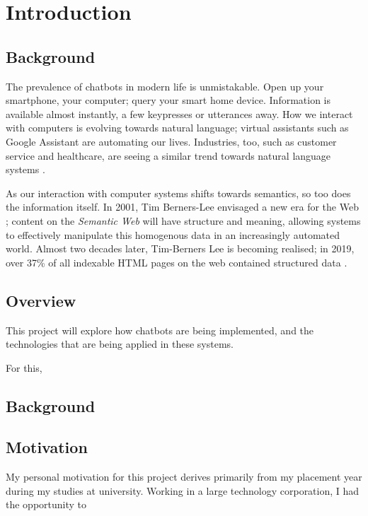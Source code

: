 \chapter{Introduction}
\label{ch:intro}
\section{Background}
The prevalence of chatbots in modern life is unmistakable. Open up your smartphone, your computer; query your smart home device. Information is available almost instantly, a few keypresses or utterances away. How we interact with computers is evolving towards natural language; virtual assistants such as Google Assistant are automating our lives. Industries, too, such as customer service and healthcare, are seeing a similar trend towards natural language systems \cite{gvr2017}.

As our interaction with computer systems shifts towards semantics, so too does the information itself. In 2001, Tim Berners-Lee envisaged a new era for the Web \cite{berners2001semantic}; content on the {\it Semantic Web} will have structure and meaning, allowing systems to effectively manipulate this homogenous data in an increasingly automated world. Almost two decades later, Tim-Berners Lee is becoming realised; in 2019, over 37\% of all indexable HTML pages on the web contained structured data \cite{wdc2019crawl}.

\hilight{[...]}


\section{Overview}
This project will explore how chatbots are being implemented, and the technologies that are being applied in these systems.

For this, 

\section{Background}

\section{Motivation}
My personal motivation for this project derives primarily from my placement year during my studies at university. Working in a large technology corporation, I had the opportunity to 

\newpage
